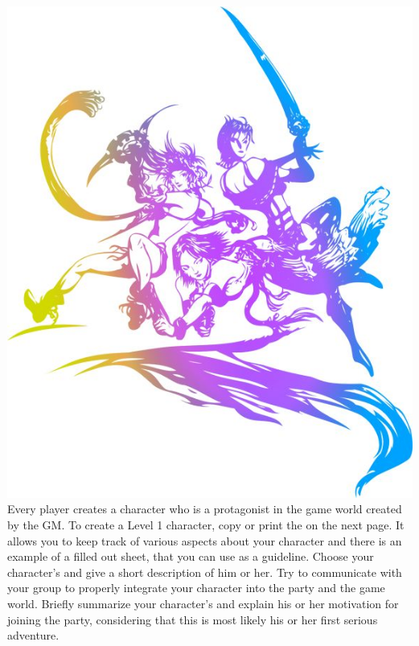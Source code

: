 %
\\
%
\includegraphics[width=\columnwidth]{./art/images/ff10-2.jpg}
%
\vfill
%
Every player creates a character who is a protagonist in the game world created by the GM.
To create a Level 1 character, copy or print the  on the next page.
It allows you to keep track of various aspects about your character and there is an example of a filled out sheet, that you can use as a guideline.
Choose your character's  and give a short description of him or her.
Try to communicate with your group to properly integrate your character into the party and the game world.
Briefly summarize your character's  and explain his or her motivation for joining the party, considering that this is most likely his or her first serious adventure.
